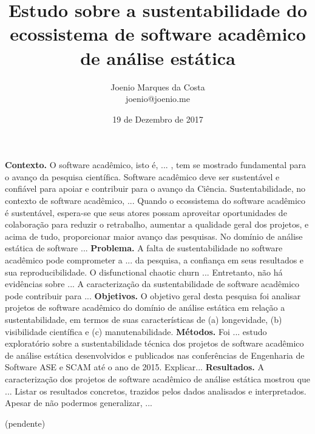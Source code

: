 \documentclass[msc, classic, a4paper]{ufbathesis}
\date{19 de Dezembro de 2017}
\title{
  Estudo sobre a sustentabilidade do ecossistema de software acadêmico de
  análise estática
}
\author{Joenio Marques da Costa\\
  {\small joenio@joenio.me}
}
\begin{document}
\frontpage
\frontmatter
\presentationpage

\resumo

\textbf{Contexto.} 
O software acadêmico, isto é, ... ,
tem se mostrado fundamental para o avanço da pesquisa científica.
Software acadêmico deve ser sustentável e confiável para apoiar e contribuir para o avanço da Ciência.
%
Sustentabilidade, no contexto de software acadêmico,  ...
%
Quando o ecossistema do software acadêmico é sustentável, espera-se que seus atores possam aproveitar
oportunidades de colaboração para reduzir o retrabalho, aumentar a qualidade
geral dos projetos, e acima de tudo, proporcionar maior avanço das pesquisas.
No domínio de análise estática de software ...
%
\textbf{Problema.} 
A falta de sustentabilidade no software acadêmico pode comprometer 
a ... da pesquisa, a confiança em seus resultados e sua reproducibilidade.
%
O disfunctional chaotic churn ...
%
Entretanto, não há evidências sobre ...
A caracterização da sustentabilidade de software acadêmico 
pode contribuir para ...
%
\textbf{Objetivos.}
O objetivo geral desta pesquisa foi analisar projetos de software acadêmico 
do domínio de análise estática 
em relação a sustentabilidade, em termos de suas características de 
(a) longevidade, (b) visibilidade científica e (c) manutenabilidade.
\textbf{Métodos.}
Foi ... estudo exploratório sobre a sustentabilidade
técnica dos projetos de software acadêmico de análise estática desenvolvidos e
publicados nas conferências de Engenharia de Software ASE e SCAM até o ano de
2015.
Explicar...
%
\textbf{Resultados.}
A caracterização dos projetos de software acadêmico de análise estática
mostrou que ...
Listar os resultados concretos, trazidos pelos dados analisados e interpretados.
Apesar de não podermos generalizar, ...

\begin{keywords}

  (pendente)

\end{keywords}
\end{document}

